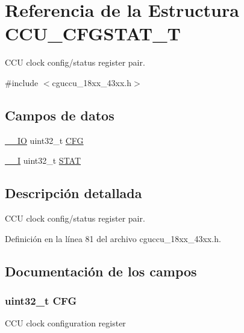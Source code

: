 \hypertarget{struct_c_c_u___c_f_g_s_t_a_t___t}{}\section{Referencia de la Estructura C\+C\+U\+\_\+\+C\+F\+G\+S\+T\+A\+T\+\_\+T}
\label{struct_c_c_u___c_f_g_s_t_a_t___t}


C\+CU clock config/status register pair.  




{\ttfamily \#include $<$cguccu\+\_\+18xx\+\_\+43xx.\+h$>$}

\subsection*{Campos de datos}
\begin{DoxyCompactItemize}
\item 
\hyperlink{core__sc300_8h_aec43007d9998a0a0e01faede4133d6be}{\+\_\+\+\_\+\+IO} uint32\+\_\+t \hyperlink{struct_c_c_u___c_f_g_s_t_a_t___t_aab6e57de9accaf9c2c24a5f70b948161}{C\+FG}
\item 
\hyperlink{core__sc300_8h_af63697ed9952cc71e1225efe205f6cd3}{\+\_\+\+\_\+I} uint32\+\_\+t \hyperlink{struct_c_c_u___c_f_g_s_t_a_t___t_a9d37b00631f37ab3e4a127a7fee46da7}{S\+T\+AT}
\end{DoxyCompactItemize}


\subsection{Descripción detallada}
C\+CU clock config/status register pair. 

Definición en la línea 81 del archivo cguccu\+\_\+18xx\+\_\+43xx.\+h.



\subsection{Documentación de los campos}
\subsubsection[{\texorpdfstring{C\+FG}{CFG}}]{ uint32\+\_\+t C\+FG}\hypertarget{struct_c_c_u___c_f_g_s_t_a_t___t_aab6e57de9accaf9c2c24a5f70b948161}{}\label{struct_c_c_u___c_f_g_s_t_a_t___t_aab6e57de9accaf9c2c24a5f70b948161}
C\+CU clock configuration register 

